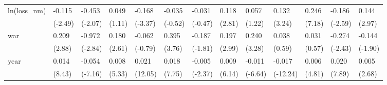 \begin{tabular}{p{1.5cm} p{1.7cm} p{1.7cm} p{1.7cm} p{1.7cm} p{1.7cm} p{1.7cm} p{1.7cm} p{1.7cm} p{1.7cm} p{1.7cm} p{1.7cm} p{1.7cm}}
\hline
ln(loss\_nm)     &   -0.115\sym{*}  &   -0.453\sym{*}  &    0.049         &   -0.168\sym{**} &   -0.035         &   -0.031         &    0.118\sym{**} &    0.057         &    0.132\sym{**} &    0.246\sym{***}&   -0.186\sym{*}  &    0.144\sym{**} \\
                &  (-2.49)         &  (-2.07)         &   (1.11)         &  (-3.37)         &  (-0.52)         &  (-0.47)         &   (2.81)         &   (1.22)         &   (3.24)         &   (7.18)         &  (-2.59)         &   (2.97)         \\
war             &    0.209\sym{**} &   -0.972\sym{**} &    0.180\sym{*}  &   -0.062         &    0.395\sym{***}&   -0.187         &    0.197\sym{**} &    0.240\sym{**} &    0.038         &    0.031         &   -0.274\sym{*}  &   -0.144         \\
                &   (2.88)         &  (-2.84)         &   (2.61)         &  (-0.79)         &   (3.76)         &  (-1.81)         &   (2.99)         &   (3.28)         &   (0.59)         &   (0.57)         &  (-2.43)         &  (-1.90)         \\
year            &    0.014\sym{***}&   -0.054\sym{***}&    0.008\sym{***}&    0.021\sym{***}&    0.018\sym{***}&   -0.005\sym{*}  &    0.009\sym{***}&   -0.011\sym{***}&   -0.017\sym{***}&    0.006\sym{***}&    0.020\sym{***}&    0.005\sym{**} \\
                &   (8.43)         &  (-7.16)         &   (5.33)         &  (12.05)         &   (7.75)         &  (-2.37)         &   (6.14)         &  (-6.64)         & (-12.24)         &   (4.81)         &   (7.89)         &   (2.68)         \\
\end{tabular}
